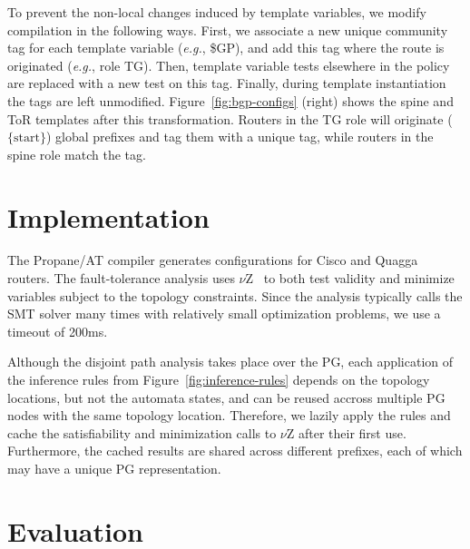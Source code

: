 \documentclass[numbers, 10pt]{sigplanconf}
\newcommand{\EG}{\emph{e.g.}}
\newcommand{\sysname}{{\text{}\small \sf Propane/AT}\xspace}
\begin{document}
To prevent the non-local changes induced by template variables, we modify compilation in the following ways. First, we associate a new unique community tag for each template variable (\EG, {\small \$GP}), and add this tag where the route is originated (\EG, role TG). Then, template variable tests elsewhere in the policy are replaced with a new test on this tag. Finally, during template instantiation the tags are left unmodified.
Figure~\ref{fig:bgp-configs} (right) shows the spine and ToR templates after this transformation. Routers in the TG role will originate ($\{ \mathrm{start} \}$) global prefixes and tag them with a unique tag, while routers in the spine role match the tag.


%
%
%
%

\section{Implementation}
\label{sec:implementation}

The \sysname compiler generates configurations for Cisco and Quagga~\cite{quagga} routers. The fault-tolerance analysis uses $\nu$Z~\cite{z3opt} to both test validity and minimize variables subject to the topology constraints. Since the analysis typically calls the SMT solver many times with relatively small optimization problems, we use a timeout of 200ms.

Although the disjoint path analysis takes place over the PG, each application of the inference rules from Figure~\ref{fig:inference-rules} depends on the topology locations, but not the automata states, and can be reused accross multiple PG nodes with the same topology location. Therefore, we lazily apply the rules and cache the satisfiability and minimization calls to $\nu$Z after their first use. Furthermore, the cached results are shared across different prefixes, each of which may have a unique PG representation.

\section{Evaluation}
\label{sec:evaluation}
\end{document}
